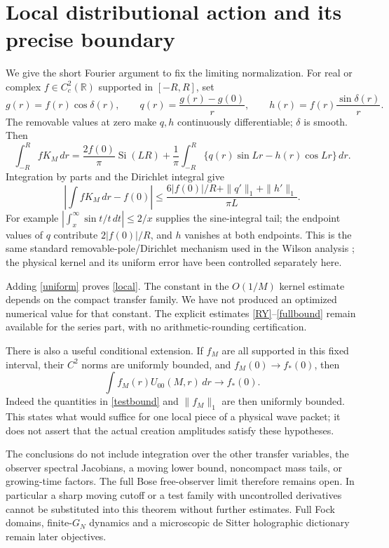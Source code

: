 \documentclass[11pt,a4paper]{article}
\begin{document}
\newpage
\section{Local distributional action and its precise boundary}
We give the short Fourier argument to fix the limiting normalization.
For real or complex $f\in C_c^2(\mathbb R)$ supported in $[-R,R]$, set
\[
 g(r)=f(r)\cos\delta(r),\qquad
 q(r)=\frac{g(r)-g(0)}r,\qquad
 h(r)=f(r)\frac{\sin\delta(r)}r .
\]
The removable values at zero make $q,h$ continuously differentiable;
$\delta$ is smooth. Then
\[
 \int_{-R}^{R} fK_M\,dr
 =\frac{2f(0)}{\pi}\operatorname{Si}(LR)
  +\frac1\pi\int_{-R}^{R}\{q(r)\sin Lr-h(r)\cos Lr\}\,dr .
\]
Integration by parts and the Dirichlet integral give
\begin{equation}
 \left|\int fK_M\,dr-f(0)\right|
 \le \frac{6|f(0)|/R+\|q'\|_1+\|h'\|_1}{\pi L}.
 \label{testbound}
\end{equation}
For example
$|\int_x^\infty\sin t/t\,dt|\le2/x$ supplies the sine-integral
tail; the endpoint values of $q$ contribute $2|f(0)|/R$,
and $h$ vanishes at both endpoints.
This is the same standard removable-pole/Dirichlet mechanism used
in the Wilson analysis \cite{wilson}; the physical kernel and its
uniform error have been controlled separately here.

Adding \eqref{uniform} proves \eqref{local}. The constant in the
$O(1/M)$ kernel estimate depends on the compact transfer family.
We have not produced an optimized numerical value for that constant.
The explicit estimates \eqref{RY}--\eqref{fullbound} remain available
for the series part, with no arithmetic-rounding certification.

There is also a useful conditional extension. If $f_M$ are all
supported in this fixed interval, their $C^2$ norms are uniformly
bounded, and $f_M(0)\to f_*(0)$, then
\[
 \int f_M(r)U_{00}(M,r)\,dr\longrightarrow f_*(0).
\]
Indeed the quantities in \eqref{testbound} and $\|f_M\|_1$ are then
uniformly bounded. This states what would suffice for one local
piece of a physical wave packet; it does not assert that the actual
creation amplitudes satisfy these hypotheses.

The conclusions do not include integration over the other transfer
variables, the observer spectral Jacobians, a moving lower bound,
noncompact mass tails, or growing-time factors.
The full Bose free-observer limit therefore remains open.
In particular a sharp moving cutoff or a test family with uncontrolled
derivatives cannot be substituted into this theorem without further
estimates. Full Fock domains, finite-$G_N$ dynamics and a microscopic
de Sitter holographic dictionary remain later objectives.
\end{document}
